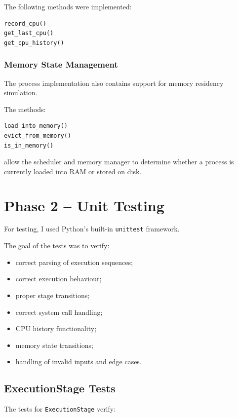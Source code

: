 \documentclass{article}
\begin{document}
The following methods were implemented:

\begin{verbatim}
record_cpu()
get_last_cpu()
get_cpu_history()
\end{verbatim}



\subsubsection{Memory State Management}

The process implementation also contains support for memory residency simulation.

The methods:

\begin{verbatim}
load_into_memory()
evict_from_memory()
is_in_memory()
\end{verbatim}

allow the scheduler and memory manager to determine whether a process is currently loaded into RAM or stored on disk.



\section{Phase 2 -- Unit Testing}

For testing, I used Python's built-in \texttt{unittest} framework.

The goal of the tests was to verify:

\begin{itemize}
    \item correct parsing of execution sequences;
    \item correct execution behaviour;
    \item proper stage transitions;
    \item correct system call handling;
    \item CPU history functionality;
    \item memory state transitions;
    \item handling of invalid inputs and edge cases.
\end{itemize}

\subsection{ExecutionStage Tests}

The tests for \texttt{ExecutionStage} verify:
\end{document}
